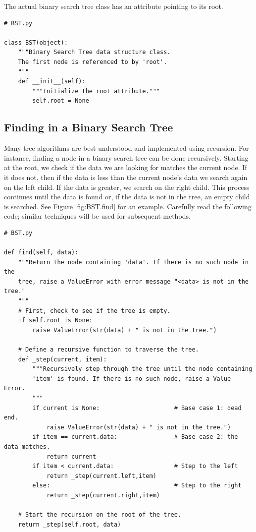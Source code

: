 The actual binary search tree class has an attribute pointing to its root.

\begin{lstlisting}
# BST.py

class BST(object):
    """Binary Search Tree data structure class.
    The first node is referenced to by 'root'.
    """
    def __init__(self):
        """Initialize the root attribute."""
        self.root = None
\end{lstlisting}

\subsection*{Finding in a Binary Search Tree}

Many tree algorithms are best understood and implemented using recursion.
For instance, finding a node in a binary search tree can be done recursively.
Starting at the root, we check if the data we are looking for matches the current node.
If it does not, then if the data is less than the current node's data we search again on the left child.
If the data is greater, we search on the right child.
This process continues until the data is found or, if the data is not in the tree, an empty child is searched.
See Figure \ref{fig:BST.find} for an example.
Carefully read the following code; similar techniques will be used for subsequent methods.

\begin{lstlisting}
# BST.py

def find(self, data):
    """Return the node containing 'data'. If there is no such node in the
    tree, raise a ValueError with error message "<data> is not in the tree."
    """
    # First, check to see if the tree is empty.
    if self.root is None:
        raise ValueError(str(data) + " is not in the tree.")
    
    # Define a recursive function to traverse the tree.
    def _step(current, item):
        """Recursively step through the tree until the node containing
        'item' is found. If there is no such node, raise a Value Error.
        """
        if current is None:                     # Base case 1: dead end.
            raise ValueError(str(data) + " is not in the tree.")
        if item == current.data:                # Base case 2: the data matches.
            return current
        if item < current.data:                 # Step to the left
            return _step(current.left,item)
        else:                                   # Step to the right
            return _step(current.right,item)
    
    # Start the recursion on the root of the tree.
    return _step(self.root, data)
\end{lstlisting}

